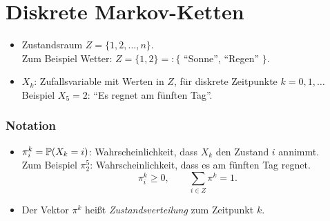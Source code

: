 \section{Diskrete Markov-Ketten}
\begin{itemize}
\item Zustandsraum $Z = \{ 1, 2, \ldots, n \}$. \\
  Zum Beispiel Wetter: $Z = \{ 1, 2 \} =: \{$ ``Sonne'', ``Regen'' $\}$.
\item $X_k$: Zufallsvariable mit Werten in $Z$, für diskrete Zeitpunkte $k = 0, 1,
  \ldots$ \\
  Beispiel $X_5 = 2$: ``Es regnet am fünften Tag''.
\end{itemize}

\subsubsection*{Notation}
\begin{itemize}
\item $\pi_i^k = \mathbb{P}( X_k = i)$: Wahrscheinlichkeit, dass $X_k$ den Zustand $i$
  annimmt. \\
  Zum Beispiel $\pi_2^5$: Wahrscheinlichkeit, dass es am fünften Tag regnet.
  \[ \pi_i^k \ge 0, \qquad \sum_{i \in Z} \pi^k = 1. \]
\item Der Vektor $\pi^k$ heißt \emph{Zustandsverteilung} zum Zeitpunkt $k$.
\end{itemize}

